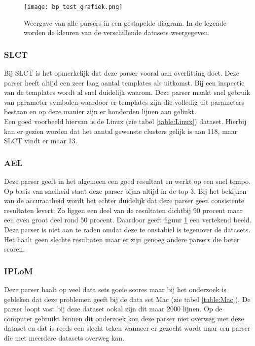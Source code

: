 \begin{figure}[!htp]
    \texttt{[image: bp\_test\_grafiek.png]}
    \caption{Weergave van alle parsers in een gestapelde diagram. In de legende worden de kleuren van de verschillende datasets weergegeven.}
    \label{pic:testgrafiek}
\end{figure}

\subsubsection{SLCT}
Bij SLCT is het opmerkelijk dat deze parser vooral aan overfitting doet. Deze parser heeft altijd een zeer laag aantal templates als uitkomst. Bij een inspectie van de templates wordt al snel duidelijk waarom. Deze parser maakt snel gebruik van parameter symbolen waardoor er templates zijn die volledig uit parameters bestaan en op deze manier zijn er honderden lijnen aan gelinkt.\\

Een goed voorbeeld hiervan is de Linux (zie tabel \ref{table:Linux}) dataset. Hierbij kan er gezien worden dat het aantal gewenste clusters gelijk is aan 118, maar SLCT vindt er maar 13.

\subsubsection{AEL}
Deze parser geeft in het algemeen een goed resultaat en werkt op een snel tempo. Op basis van snelheid staat deze parser bijna altijd in de top 3. Bij het bekijken van de accuraatheid wordt het echter duidelijk dat deze parser geen consistente resultaten levert. Zo liggen een deel van de resultaten dichtbij 90 procent maar een even groot deel rond 50 procent. Daardoor geeft figuur \ref{pic:testgrafiek} een vertekend beeld.\\

Deze parser is niet aan te raden omdat deze te onstabiel is tegenover de datasets. Het haalt geen slechte resultaten maar er zijn genoeg andere parsers die beter scoren.

\subsubsection{IPLoM}
Deze parser haalt op veel data sets goeie scores maar bij het onderzoek is gebleken dat deze problemen geeft bij de data set Mac (zie tabel \ref{table:Mac}). De parser loopt vast bij deze dataset ookal zijn dit maar 2000 lijnen. Op de computer gebruikt binnen dit onderzoek kon deze parser niet overweg met deze dataset en dat is reeds een slecht teken wanneer er gezocht wordt naar een parser die met meerdere datasets overweg kan.\\

